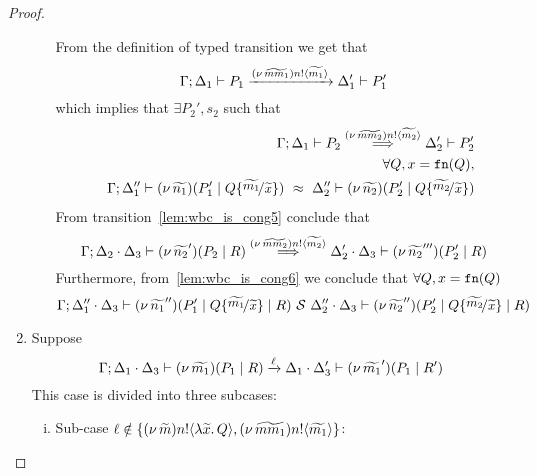 \begin{proof}
\begin{enumerate}
\begin{enumerate}[i.]
							\noi From the definition of typed transition we get that
							\[
								\Gamma; \Delta_1 \vdash P_1 \xrightarrow{(\nu\, \widetilde{mm_1}) n ! \langle \widetilde{m_1} \rangle} \Delta_1' \vdash P_1'
							\]
							\noi which implies that $\exists P_2', s_2$ such that
							\begin{eqnarray}
								&& \horel{\Gamma}{\Delta_1}{P_2}
								{\By{\news{\widetilde{mm_2}} \bactout{n}{\widetilde{m_2}}}}
								{\Delta_2'}{P_2'}
								\label{lem:wbc_is_cong5}\\
								&&\forall Q, x = \fn{Q}, \nonumber \\%
								&& \horel{\Gamma}{\Delta_1''}{\newsp{\widetilde{n_1}}{P_1' \Par Q \subst{\widetilde{m_1}}{\widetilde{x}}}}
								{\ \wbc\ }
								{\Delta_2''}{\newsp{\widetilde{n_2}}{P_2' \Par Q \subst{\widetilde{m_2}}{\widetilde{x}}}}
								\label{lem:wbc_is_cong6}
							\end{eqnarray}
						\noi From transition~\eqref{lem:wbc_is_cong5} conclude that 
						\[
							\Gamma; \Delta_2 \cdot \Delta_3 \vdash (\nu\, \widetilde{n_2}')(P_2 \;|\; R) \stackrel{(\nu\, \widetilde{mm_2}) n ! \langle \widetilde{m_2} \rangle}{\Longrightarrow} \Delta_2' \cdot \Delta_3 \vdash (\nu\, \widetilde{n_2}''')(P_2' \;|\; R)
						\]
						\noi Furthermore, from~\eqref{lem:wbc_is_cong6} we conclude that $\forall Q, x = \mathtt{fn}(Q)$
						\[
							\horel{\Gamma}{\Delta_1'' \cat \Delta_3}{\newsp{\widetilde{n_1}''}{P_1' \Par Q \subst{\widetilde{m_1}}{\widetilde{x}} \Par R}}
							{\ \mathcal{S}\ }
							{\Delta_2'' \cat \Delta_3}{\newsp{\widetilde{n_2}''}{P_2' \Par Q \subst{\widetilde{m_2}}{\widetilde{x}} \Par R}}
						\]
				\end{enumerate}

		\item Suppose
				\[
					\Gamma; \Delta_1 \cdot \Delta_3 \vdash (\nu\, \widetilde{m_1})(P_1 \;|\; R) \xrightarrow{\ell} \Delta_1 \cdot \Delta_3' \vdash (\nu\, \widetilde{m_1}')(P_1 \;|\; R')
				\]
				\noi This case is divided into three subcases:

				\begin{enumerate}[i.]
					\item Sub-case 	$\ell \notin \{(\nu\, \widetilde{m}) n ! \langle \lambda \widetilde{x}.\,Q \rangle, (\nu\, \widetilde{mm_1}) n ! \langle \widetilde{m_1} \rangle\}$:


\end{enumerate}
\end{enumerate}
\end{proof}
